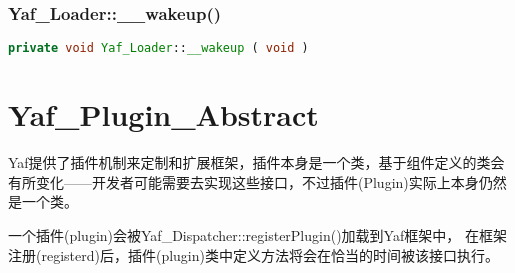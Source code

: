 \subsection{Yaf\_Loader::\_\_wakeup()}


\begin{lstlisting}[language=PHP]
private void Yaf_Loader::__wakeup ( void )
\end{lstlisting}

\chapter{Yaf\_Plugin\_Abstract}

Yaf提供了插件机制来定制和扩展框架，插件本身是一个类，基于组件定义的类会有所变化——开发者可能需要去实现这些接口，不过插件(Plugin)实际上本身仍然是一个类。

一个插件(plugin)会被Yaf\_Dispatcher::registerPlugin()加载到Yaf框架中， 在框架注册(registerd)后，插件(plugin)类中定义方法将会在恰当的时间被该接口执行。



